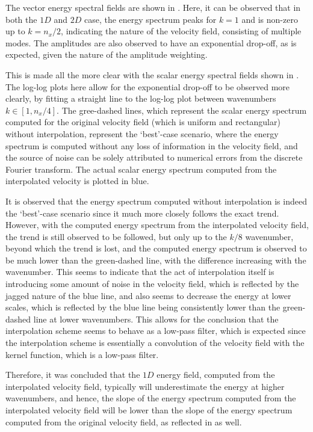 The vector energy spectral fields are shown in . Here, it can be observed that in both the $1D$ and $2D$ case, the energy spectrum peaks for $k=1$ and is non-zero up to $k=n_x/2$, indicating the nature of the velocity field, consisting of multiple modes. The amplitudes are also observed to have an exponential drop-off, as is expected, given the nature of the amplitude weighting.

This is made all the more clear with the scalar energy spectral fields shown in . The log-log plots here allow for the exponential drop-off to be observed more clearly, by fitting a straight line to the log-log plot between wavenumbers $k \in [1, n_x/4]$. The gree-dashed lines, which represent the scalar energy spectrum computed for the original velocity field (which is uniform and rectangular) without interpolation, represent the `best'-case scenario, where the energy spectrum is computed without any loss of information in the velocity field, and the source of noise can be solely attributed to numerical errors from the discrete Fourier transform. The actual scalar energy spectrum computed from the interpolated velocity is plotted in blue.

It is observed that the energy spectrum computed without interpolation is indeed the `best'-case scenario since it much more closely follows the exact trend. However, with the computed energy spectrum from the interpolated velocity field, the trend is still observed to be followed, but only up to the $k/8$ wavenumber, beyond which the trend is lost, and the computed energy spectrum is observed to be much lower than the green-dashed line, with the difference increasing with the wavenumber.
This seems to indicate that the act of interpolation itself is introducing some amount of noise in the velocity field, which is reflected by the jagged nature of the blue line, and also seems to decrease the energy at lower scales, which is reflected by the blue line being consistently lower than the green-dashed line at lower wavenumbers. This allows for the conclusion that the interpolation scheme seems to behave as a low-pass filter, which is expected since the interpolation scheme is essentially a convolution of the velocity field with the kernel function, which is a low-pass filter.

Therefore, it was concluded that the $1D$ energy field, computed from the interpolated velocity field, typically will underestimate the energy at higher wavenumbers, and hence, the slope of the energy spectrum computed from the interpolated velocity field will be lower than the slope of the energy spectrum computed from the original velocity field, as reflected in  as well.

